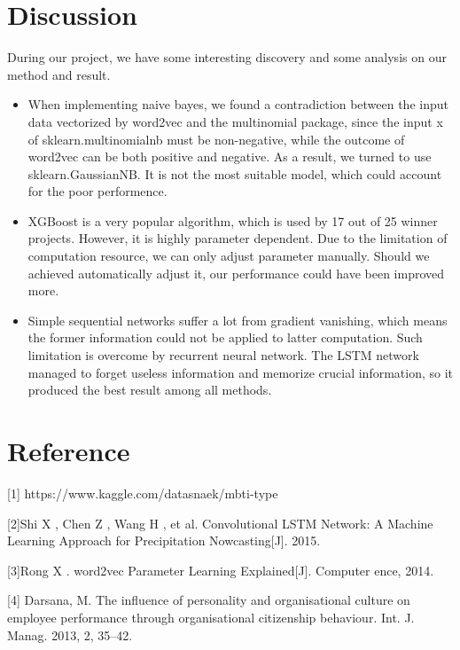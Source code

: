 \documentclass{article}
\begin{document}
\section{Discussion}
During our project, we have some interesting discovery and some analysis on our method and result.
\begin{itemize}
	\item When implementing naive bayes, we found a contradiction between the input data vectorized by word2vec and the multinomial package, since the input x of sklearn.multinomialnb must be non-negative, while the outcome of word2vec can be both positive and negative. As a result, we turned to use sklearn.GaussianNB. It is not the most suitable model, which could account for the poor performence.
	\item XGBoost is a very popular algorithm, which is used by 17 out of 25 winner projects. However, it is highly parameter dependent. Due to the limitation of computation resource, we can only adjust parameter manually. Should we achieved automatically adjust it, our performance could have been improved more.
	\item Simple sequential networks suffer a lot from gradient vanishing, which means the former information could not be applied to latter computation. Such limitation is overcome by recurrent neural network. The LSTM network managed to forget useless information and memorize crucial information, so it produced the best result among all methods.
\end{itemize}




\section{Reference}


\small

[1] https://www.kaggle.com/datasnaek/mbti-type

[2]Shi X , Chen Z , Wang H , et al. Convolutional LSTM Network: A Machine Learning Approach for Precipitation Nowcasting[J]. 2015.

[3]Rong X . word2vec Parameter Learning Explained[J]. Computer ence, 2014.

[4] Darsana, M. The influence of personality and organisational culture on employee performance through organisational citizenship behaviour. Int. J. Manag. 2013, 2, 35–42. 
\end{document}
